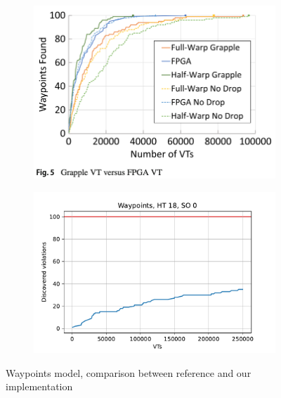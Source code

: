 \documentclass[
fancyheadings, %
%
%
]{stsreprt}
\begin{document}
\begin{figure}[h]
    \begin{subfigure}[b]{.5\textwidth}
        \centering
        \includegraphics[width=\textwidth]{../evaluation/assets/EXP-00-grapple-paper-waypoints.png}
        \label{fig:evaluation:EXP-00:1}
    \end{subfigure}
    \begin{subfigure}[b]{.5\textwidth}
        \centering
        \includegraphics[width=\textwidth]{../evaluation/output-assets/EXP-00-comparison-with-paper.pdf}
        \label{fig:evaluation:EXP-00:2}
    \end{subfigure}
    \caption{Waypoints model, comparison between reference and our implementation}
    \label{fig:evaluation:EXP-00}
\end{figure}
\end{document}

